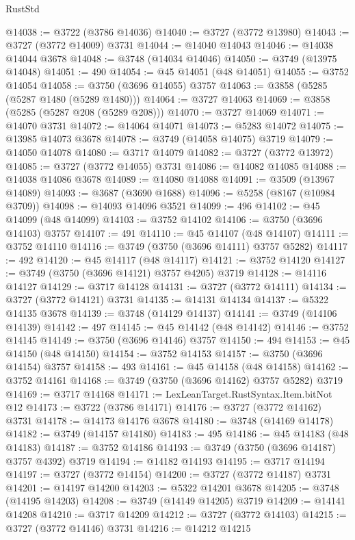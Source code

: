 \begin{lexlean}{RustStd}
\begin{coremodule}
@14038 := @3722 (@3786 @14036)
@14040 := @3727 (@3772 @13980)
@14043 := @3727 (@3772 @14009) @3731
@14044 := @14040 @14043
@14046 := @14038 @14044 @3678
@14048 := @3748 (@14034 @14046)
@14050 := @3749 (@13975 @14048)
@14051 := 490
@14054 := @45 @14051 (@48 @14051)
@14055 := @3752 @14054
@14058 := @3750 (@3696 @14055) @3757
@14063 := @3858 (@5285 (@5287 @1480 (@5289 @1480)))
@14064 := @3727 @14063
@14069 := @3858 (@5285 (@5287 @208 (@5289 @208)))
@14070 := @3727 @14069
@14071 := @14070 @3731
@14072 := @14064 @14071
@14073 := @5283 @14072
@14075 := @13985 @14073 @3678
@14078 := @3749 (@14058 @14075) @3719
@14079 := @14050 @14078
@14080 := @3717 @14079
@14082 := @3727 (@3772 @13972)
@14085 := @3727 (@3772 @14055) @3731
@14086 := @14082 @14085
@14088 := @14038 @14086 @3678
@14089 := @14080 @14088
@14091 := @3509 (@13967 @14089)
@14093 := @3687 (@3690 @1688)
@14096 := @5258 (@8167 (@10984 @3709))
@14098 := @14093 @14096 @3521
@14099 := 496
@14102 := @45 @14099 (@48 @14099)
@14103 := @3752 @14102
@14106 := @3750 (@3696 @14103) @3757
@14107 := 491
@14110 := @45 @14107 (@48 @14107)
@14111 := @3752 @14110
@14116 := @3749 (@3750 (@3696 @14111) @3757 @5282)
@14117 := 492
@14120 := @45 @14117 (@48 @14117)
@14121 := @3752 @14120
@14127 := @3749 (@3750 (@3696 @14121) @3757 @4205) @3719
@14128 := @14116 @14127
@14129 := @3717 @14128
@14131 := @3727 (@3772 @14111)
@14134 := @3727 (@3772 @14121) @3731
@14135 := @14131 @14134
@14137 := @5322 @14135 @3678
@14139 := @3748 (@14129 @14137)
@14141 := @3749 (@14106 @14139)
@14142 := 497
@14145 := @45 @14142 (@48 @14142)
@14146 := @3752 @14145
@14149 := @3750 (@3696 @14146) @3757
@14150 := 494
@14153 := @45 @14150 (@48 @14150)
@14154 := @3752 @14153
@14157 := @3750 (@3696 @14154) @3757
@14158 := 493
@14161 := @45 @14158 (@48 @14158)
@14162 := @3752 @14161
@14168 := @3749 (@3750 (@3696 @14162) @3757 @5282) @3719
@14169 := @3717 @14168
@14171 := LexLeanTarget.RustSyntax.Item.bitNot @12
@14173 := @3722 (@3786 @14171)
@14176 := @3727 (@3772 @14162) @3731
@14178 := @14173 @14176 @3678
@14180 := @3748 (@14169 @14178)
@14182 := @3749 (@14157 @14180)
@14183 := 495
@14186 := @45 @14183 (@48 @14183)
@14187 := @3752 @14186
@14193 := @3749 (@3750 (@3696 @14187) @3757 @4392) @3719
@14194 := @14182 @14193
@14195 := @3717 @14194
@14197 := @3727 (@3772 @14154)
@14200 := @3727 (@3772 @14187) @3731
@14201 := @14197 @14200
@14203 := @5322 @14201 @3678
@14205 := @3748 (@14195 @14203)
@14208 := @3749 (@14149 @14205) @3719
@14209 := @14141 @14208
@14210 := @3717 @14209
@14212 := @3727 (@3772 @14103)
@14215 := @3727 (@3772 @14146) @3731
@14216 := @14212 @14215

\end{coremodule}
\end{lexlean}
